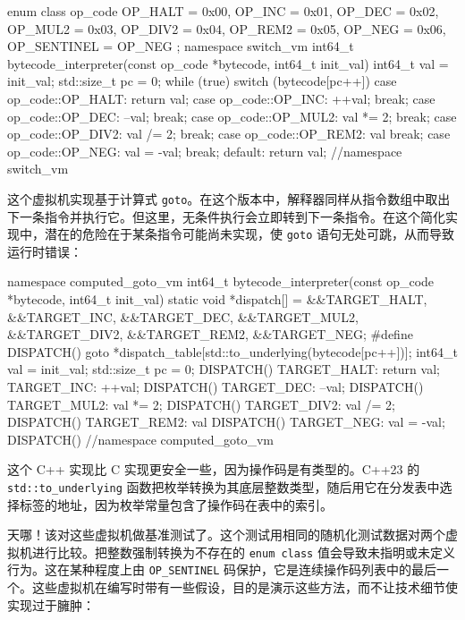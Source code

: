 \begin{codebox}[cpp]
enum class op_code {
  OP_HALT = 0x00,
  OP_INC = 0x01,
  OP_DEC = 0x02,
  OP_MUL2 = 0x03,
  OP_DIV2 = 0x04,
  OP_REM2 = 0x05,
  OP_NEG = 0x06,
  OP_SENTINEL = OP_NEG
};
namespace switch_vm {
int64_t bytecode_interpreter(const op_code *bytecode, int64_t init_val) {
  int64_t val = init_val;
  std::size_t pc = 0;
  while (true) {
    switch (bytecode[pc++]) {
    case op_code::OP_HALT:
      return val;
    case op_code::OP_INC:
      ++val;
      break;
    case op_code::OP_DEC:
      --val;
      break;
    case op_code::OP_MUL2:
      val *= 2;
      break;
    case op_code::OP_DIV2:
      val /= 2;
      break;
    case op_code::OP_REM2:
      val %
      break;
    case op_code::OP_NEG:
      val = -val;
      break;
    default:
      return val;
    }
  }
}
} //namespace switch_vm
\end{codebox}

\label{idx:1300}
这个虚拟机实现基于计算式 \texttt{goto}。在这个版本中，解释器同样从指令数组中取出下一条指令并执行它。但这里，无条件执行会立即转到下一条指令。在这个简化实现中，潜在的危险在于某条指令可能尚未实现，使 \texttt{goto} 语句无处可跳，从而导致运行时错误：

\begin{codebox}[cpp]
namespace computed_goto_vm {
int64_t bytecode_interpreter(const op_code *bytecode, int64_t init_val) {
  static void *dispatch[] = {&&TARGET_HALT, &&TARGET_INC,  &&TARGET_DEC,
                           &&TARGET_MUL2, &&TARGET_DIV2, &&TARGET_REM2,
                           &&TARGET_NEG};
#define DISPATCH() goto *dispatch_table[std::to_underlying(bytecode[pc++])];
  int64_t val = init_val;
  std::size_t pc = 0;
  DISPATCH()
TARGET_HALT: { return val; }
TARGET_INC: {
  ++val;
  DISPATCH()
}
TARGET_DEC: {
  --val;
  DISPATCH()
}
TARGET_MUL2: {
  val *= 2;
  DISPATCH()
}
TARGET_DIV2: {
  val /= 2;
  DISPATCH()
}
TARGET_REM2: {
  val %
  DISPATCH()
}
TARGET_NEG: {
  val = -val;
  DISPATCH()
}
}
} //namespace computed_goto_vm
\end{codebox}

这个 C++ 实现比 C 实现更安全一些，因为操作码是有类型的。C++23 的 \texttt{std::\allowbreak{}to\_\allowbreak{}underlying} 函数把枚举转换为其底层整数类型，随后用它在分发表中选择标签的地址，因为枚举常量包含了操作码在表中的索引。

\label{idx:1301}
天哪！该对这些虚拟机做基准测试了。这个测试用相同的随机化测试数据对两个虚拟机进行比较。把整数强制转换为不存在的 \texttt{enum class} 值会导致未指明或未定义行为。这在某种程度上由 \texttt{OP\_\allowbreak{}SENTINEL} 码保护，它是连续操作码列表中的最后一个。这些虚拟机在编写时带有一些假设，目的是演示这些方法，而不让技术细节使实现过于臃肿：

